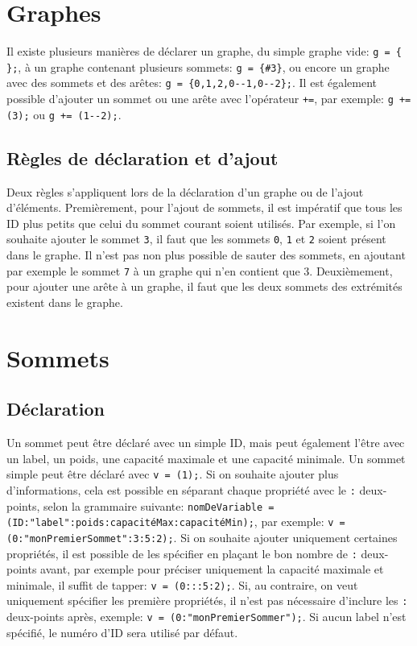 \documentclass[french]{article}
\begin{document}
	\section{Graphes}
	Il existe plusieurs manières de déclarer un graphe, du simple graphe vide: \texttt{g = \{ \};}, à un graphe contenant plusieurs sommets: \texttt{g = \{\#3\}}, ou encore un graphe avec des sommets et des arêtes: \texttt{g = \{0,1,2,0-{}-1,0-{}-2\};}. Il est également possible d'ajouter un sommet ou une arête avec l'opérateur \texttt{+=}, par exemple: \texttt{g += (3);} ou \texttt{g += (1-{}-2);}.
	
		\subsection{Règles de déclaration et d'ajout}
		Deux règles s'appliquent lors de la déclaration d'un graphe ou de l'ajout d'éléments. Premièrement, pour l'ajout de sommets, il est impératif que tous les ID plus petits que celui du sommet courant soient utilisés. Par exemple, si l'on souhaite ajouter le sommet \texttt{3}, il faut que les sommets \texttt{0}, \texttt{1} et \texttt{2} soient présent dans le graphe. Il n'est pas non plus possible de sauter des sommets, en ajoutant par exemple le sommet \texttt{7} à un graphe qui n'en contient que 3.
		Deuxièmement, pour ajouter une arête à un graphe, il faut que les deux sommets des extrémités existent dans le graphe.
		
	\section{Sommets}
		\subsection{Déclaration}
		Un sommet peut être déclaré avec un simple ID, mais peut également l'être avec un label, un poids, une capacité maximale et une capacité minimale. Un sommet simple peut être déclaré avec \texttt{v = (1);}. Si on souhaite ajouter plus d'informations, cela est possible en séparant chaque propriété avec le \texttt{:} deux-points, selon la grammaire suivante: \texttt{nomDeVariable = (ID:"label":poids:capacitéMax:capacitéMin);}, par exemple: \texttt{v = (0:"monPremierSommet":3:5:2);}. Si on souhaite ajouter uniquement certaines propriétés, il est possible de les spécifier en plaçant le bon nombre de \texttt{:} deux-points avant, par exemple pour préciser uniquement la capacité maximale et minimale, il suffit de tapper: \texttt{v = (0:::5:2);}. Si, au contraire, on veut uniquement spécifier les première propriétés, il n'est pas nécessaire d'inclure les \texttt{:} deux-points après, exemple: \texttt{v = (0:"monPremierSommer");}. Si aucun label n'est spécifié, le numéro d'ID sera utilisé par défaut.
		
\end{document}
